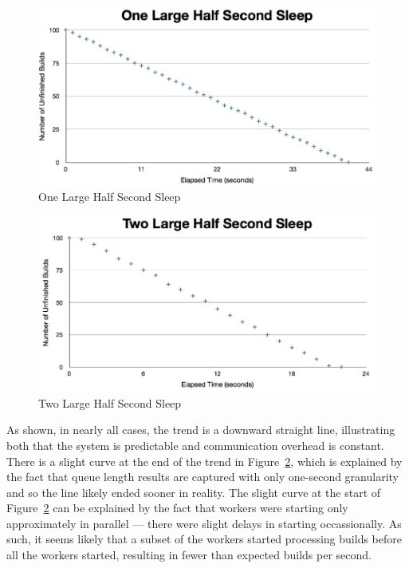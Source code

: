 \documentclass{scrartcl}
\begin{document}
\begin{figure}[h!]
  \begin{center}
    \includegraphics[scale=0.45]{raw_data/sleep0.5/one_large/graph.jpg}
  \end{center}
  \caption{One Large Half Second Sleep}
  \label{fig:sleephalf_one_large_queuelength}
\end{figure}

\begin{figure}[h!]
  \begin{center}
    \includegraphics[scale=0.45]{raw_data/sleep0.5/two_large/graph.jpg}
  \end{center}
  \caption{Two Large Half Second Sleep}
  \label{fig:sleephalf_two_large_queuelength}
\end{figure}

As shown, in nearly all cases, the trend is a downward straight line, illustrating both that the system is predictable and communication overhead is constant.
There is a slight curve at the end of the trend in Figure~\ref{fig:sleephalf_two_large_queuelength}, which is explained by the fact that queue length results are captured with only one-second granularity and so the line likely ended sooner in reality.
The slight curve at the start of Figure~\ref{fig:sleephalf_two_large_queuelength} can be explained by the fact that workers were starting only approximately in parallel --- there were slight delays in starting occassionally.
As such, it seems likely that a subset of the workers started processing builds before all the workers started, resulting in fewer than expected builds per second.
\end{document}

